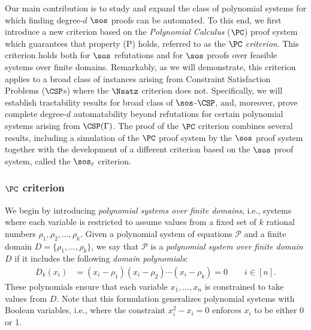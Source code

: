 \documentclass[11pt]{article}
\begin{document}
Our main contribution is to study and expand the class of polynomial systems for which finding degree-$d$ \(\sos\) proofs can be automated. To this end, we first introduce a new criterion based on the \textit{Polynomial Calculus} ($\PC$) proof system which guarantees that property (\textsc{P}) holds, referred to as the \textit{$\PC$ criterion}. This criterion holds both for $\sos$ refutations and for $\sos$ proofs over feasible systems over finite domains. Remarkably, as we will demonstrate, this criterion applies to a broad class of instances arising from Constraint Satisfaction Problems ($\CSP$s) where the $\Nsatz$ criterion does not. Specifically, we will establish tractability results for broad class of $\sos$-$\CSP$, and, moreover, prove complete degree-$d$ automatability beyond refutations for certain polynomial systems arising from $\CSP(\Gamma)$. The proof of the $\PC$ criterion combines several results, including a simulation of the $\PC$ proof system by the $\sos$  proof system together with the development of a different criterion based on the $\sos$ proof system, called the \(\sos_{\varepsilon}\) criterion.

\subsubsection*{$\PC$ criterion} \label{sect:PC-crit}
We begin by introducing \textit{polynomial systems over finite domains}, i.e., systems where each variable is restricted to assume values from a fixed set of $k$ rational numbers $ \rho_{1}, \rho_{2}, \ldots, \rho_{k} $. Given a polynomial system of equations $\mathcal{P}$ and a finite domain $D = \{\rho_1, \ldots, \rho_{k}\}$, we say that $\mathcal{P}$ is a \emph{polynomial system over finite domain $D$} if it includes the following \textit{domain polynomials}:
\begin{align}
D_{k}(x_i)&=(x_i-\rho_{1})(x_i-\rho_{2})\cdots (x_i-\rho_{k}) = 0\qquad i\in[n].
\end{align}
These polynomials ensure that each variable $x_1, \ldots, x_n$ is constrained to take values from $D$. Note that this formulation generalizes polynomial systems with Boolean variables, i.e., where the constraint \( x_i^2 - x_i = 0 \) enforces $x_i$ to be either 0 or 1.
\end{document}
